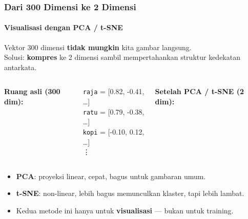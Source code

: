 \documentclass[t,aspectratio=169,xcolor=dvipsnames]{beamer}
\begin{document}
\begin{frame}
    \frametitle{Dari 300 Dimensi ke 2 Dimensi}
    \framesubtitle{Visualisasi dengan PCA / t-SNE}
    \small
    Vektor 300 dimensi \textbf{tidak mungkin} kita gambar langsung.\\
    Solusi: \textbf{kompres} ke 2 dimensi sambil mempertahankan struktur kedekatan antarkata.

    \vspace{0.3em}
    \begin{columns}[T]
        \textbf{Ruang asli (300 dim):}\\[0.3em]
        \begin{tcolorbox}[colback=gray!10, colframe=gray!40, fontupper=\small]
            \texttt{raja}   = [0.82, -0.41, \ldots]\\
            \texttt{ratu}   = [0.79, -0.38, \ldots]\\
            \texttt{kopi}   = [-0.10, 0.12, \ldots]\\
            \vdots
        \end{tcolorbox}

        \textbf{Setelah PCA / t-SNE (2 dim):}
        \vspace{0.2em}
        \begin{center}
        \end{center}
    \end{columns}
    \vspace{0.2em}
    \begin{itemize}
        \item \textbf{PCA}: proyeksi linear, cepat, bagus untuk gambaran umum.
        \item \textbf{t-SNE}: non-linear, lebih bagus memunculkan klaster, tapi lebih lambat.
        \item Kedua metode ini hanya untuk \textbf{visualisasi} --- bukan untuk training.
    \end{itemize}
\end{frame}
\end{document}
